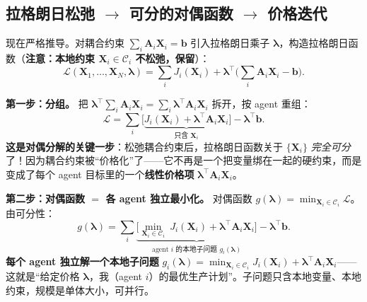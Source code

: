 \subsection{拉格朗日松弛 \texorpdfstring{$\to$}{->} 可分的对偶函数 \texorpdfstring{$\to$}{->} 价格迭代}
\label{sec:dmpc-dual-derive}

现在严格推导。对耦合约束 $\sum_i \mathbf{A}_i\mathbf{X}_i=\mathbf{b}$ 引入拉格朗日乘子 $\boldsymbol{\lambda}$，构造拉格朗日函数（\textbf{注意：本地约束 $\mathbf{X}_i\in\mathcal{C}_i$ 不松弛，保留}）：
\begin{equation}
  \mathcal{L}(\mathbf{X}_1,\dots,\mathbf{X}_N,\boldsymbol{\lambda}) = \sum_i J_i(\mathbf{X}_i) + \boldsymbol{\lambda}^\top\Big(\sum_i \mathbf{A}_i\mathbf{X}_i-\mathbf{b}\Big).
  \label{eq:dmpc-lagrangian}
\end{equation}

\textbf{第一步：分组。} 把 $\boldsymbol{\lambda}^\top\sum_i \mathbf{A}_i\mathbf{X}_i=\sum_i\boldsymbol{\lambda}^\top \mathbf{A}_i\mathbf{X}_i$ 拆开，按 agent 重组：
\begin{equation}
  \mathcal{L} = \sum_i\big[\underbrace{J_i(\mathbf{X}_i)+\boldsymbol{\lambda}^\top \mathbf{A}_i\mathbf{X}_i}_{\text{只含 }\mathbf{X}_i}\big] - \boldsymbol{\lambda}^\top\mathbf{b}.
  \label{eq:dmpc-lagrangian-split}
\end{equation}
\textbf{这是对偶分解的关键一步}：松弛耦合约束后，拉格朗日函数关于 $\{\mathbf{X}_i\}$ \emph{完全可分}了！因为耦合约束被“价格化”了——它不再是一个把变量绑在一起的硬约束，而是变成了每个 agent 目标里的一个\textbf{线性价格项} $\boldsymbol{\lambda}^\top \mathbf{A}_i\mathbf{X}_i$。

\textbf{第二步：对偶函数 $=$ 各 agent 独立最小化。} 对偶函数 $g(\boldsymbol{\lambda})=\min_{\mathbf{X}_i\in\mathcal{C}_i}\mathcal{L}$。由可分性：
\begin{equation}
  g(\boldsymbol{\lambda}) = \sum_i\underbrace{\Big[\min_{\mathbf{X}_i\in\mathcal{C}_i}\ J_i(\mathbf{X}_i)+\boldsymbol{\lambda}^\top \mathbf{A}_i\mathbf{X}_i\Big]}_{\text{agent }i\text{ 的本地子问题 }g_i(\boldsymbol{\lambda})} - \boldsymbol{\lambda}^\top\mathbf{b}.
  \label{eq:dmpc-dualfunc}
\end{equation}
\textbf{每个 agent 独立解一个本地子问题} $g_i(\boldsymbol{\lambda})=\min_{\mathbf{X}_i\in\mathcal{C}_i}J_i(\mathbf{X}_i)+\boldsymbol{\lambda}^\top \mathbf{A}_i\mathbf{X}_i$——这就是“给定价格 $\boldsymbol{\lambda}$，我（agent $i$）的最优生产计划”。子问题只含本地变量、本地约束，规模是单体大小，可并行。

